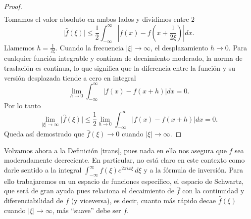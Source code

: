 \documentclass[12pt]{article}
\theoremstyle{plain}
\theoremstyle{definition}
\numberwithin{equation}{section}
\begin{document}
\begin{proof}
\begin{align*}
                \end{align*}
                Tomamos el valor absoluto en ambos lados y dividimos entre $2$
                $$\vert{}\hat{f}(\xi)\vert{} \le \frac{1}{2} \int_{-\infty}^{\infty} \left\vert{} f(x) - f\left(x + \frac{1}{2\xi}\right) \right\vert{} dx.$$
                Llamemos $h = \frac{1}{2\xi}$. Cuando la frecuencia $\vert{}\xi\vert{} \to \infty$, el desplazamiento $h \to 0$. Para cualquier función integrable y continua de decaimiento moderado, la norma de traslación es continua, lo que significa que la diferencia entre la función y su versión desplazada tiende a cero en integral
                $$\lim_{h \to 0} \int_{-\infty}^{\infty} \vert{}f(x) - f(x+h)\vert{} dx = 0.$$
                Por lo tanto
                $$\lim_{\vert{}\xi\vert{} \to \infty} \vert{}\hat{f}(\xi)\vert{} \le \frac{1}{2} \lim_{h \to 0} \int_{-\infty}^{\infty} \vert{}f(x) - f(x+h)\vert{} dx = 0.$$
                Queda así demostrado que $\hat{f}(\xi) \to 0$ cuando $\vert{}\xi\vert{} \to \infty$.
            \end{proof}

            Volvamos ahora a la \hyperref[trans]{Definición \ref*{trans}}, pues nada en ella nos asegura que \(\hat{f}\) sea moderadamente decreciente. En particular, no está claro en este contexto como darle sentido a la integral \(\int_{-\infty}^{\infty} f(\xi) e^{2\pi i x \xi}\,d\xi\) y a la fórmula de inversión.
            Para ello trabajaremos en un espacio de funciones específico, el espacio de Schwartz, que será de gran ayuda pues relaciona el decaimiento de \(\hat{f}\) con la continuidad y diferenciabilidad de \(f\) (y viceversa), es decir, cuanto más rápido decae \(\hat{f}(\xi)\) cuando \(\left\lvert \xi\right\rvert \to \infty \), más ``suave'' debe ser \(f\).
\end{document}
